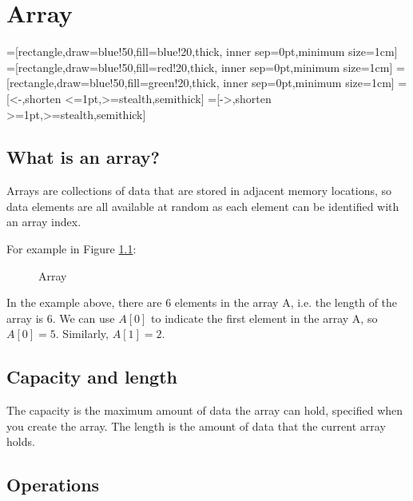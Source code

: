 
\chapter{Array}

=[rectangle,draw=blue!50,fill=blue!20,thick, inner sep=0pt,minimum size=1cm]
=[rectangle,draw=blue!50,fill=red!20,thick, inner sep=0pt,minimum size=1cm]
=[rectangle,draw=blue!50,fill=green!20,thick, inner sep=0pt,minimum size=1cm]
=[<-,shorten <=1pt,>=stealth,semithick]
=[->,shorten >=1pt,>=stealth,semithick]
\section{What is an array?}

Arrays are collections of data that are stored in adjacent memory locations, so data elements are all available at random as each element can be identified with an array index.


For example in Figure \ref{fig:array-index}:
\begin{figure}[!htp]
  \centering
  
  \caption{Array}
  \label{fig:array-index}
\end{figure}


In the example above, there are 6 elements in the array A, i.e. the
length of the array is 6. We can use $A[0]$ to indicate the first
element in the array A, so$A[0] = 5$. Similarly, $A[1] = 2$.




\section{Capacity and length}


The capacity is the maximum amount of data the array can hold, specified when you create the array.
The length is the amount of data that the current array holds.



\section{Operations}


